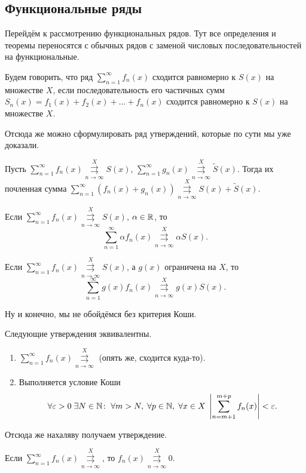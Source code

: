 \documentclass[a4paper, 12pt]{article}
\begin{document}
	\subsection{Функциональные ряды}
	Перейдём к рассмотрению функциональных рядов. Тут все определения и теоремы переносятся с обычных рядов с заменой числовых последовательностей на функциональные.
	\begin{Def}
		Будем говорить, что ряд $\sum\limits_{n=1}^{\infty}f_n(x)$ сходится равномерно к $S(x)$ на множестве $X$, если последовательность его частичных сумм $S_n(x) = f_1(x) + f_2(x) + \ldots + f_n(x)$ сходится равномерно к $S(x)$ на множестве $X$. 
	\end{Def}
	Отсюда же можно сформулировать ряд утверждений, которые по сути мы уже доказали.
	\begin{Statement}
		Пусть $\sum\limits_{n=1}^\infty f_n(x) \overset{X}{\underset{n\to\infty}{\rightrightarrows}} S(x)$, 
		$\sum\limits_{n=1}^\infty g_n(x) \overset{X}{\underset{n\to\infty}{\rightrightarrows}} \tilde{S}(x)$. Тогда их почленная сумма $\sum\limits_{n=1}^\infty  (f_n(x) + g_n(x) ) \overset{X}{\underset{n\to\infty}{\rightrightarrows}} S(x) + \tilde{S}(x)$.
	\end{Statement}
	\begin{Statement}
		Если $\sum\limits_{n=1}^\infty f_n(x) \overset{X}{\underset{n\to\infty}{\rightrightarrows}} S(x)$, $\alpha \in \mathbb{R}$, то
		$$
			\sum\limits_{n=1}^\infty \alpha f_n(x) \overset{X}{\underset{n\to\infty}{\rightrightarrows}} \alpha S(x).
		$$
	\end{Statement}
	\begin{Statement}
		Если $\sum\limits_{n=1}^\infty f_n(x) \overset{X}{\underset{n\to\infty}{\rightrightarrows}} S(x)$, а $g(x)$ ограничена на $X$, то 
		$$
		\sum\limits_{n=1}^\infty g(x) f_n(x) \overset{X}{\underset{n\to\infty}{\rightrightarrows}} g(x)S(x).
		$$
	\end{Statement}
	Ну и конечно, мы не обойдёмся без критерия Коши.
	\begin{Statement}
		Следующие утверждения эквивалентны.
		\begin{enumerate}
			\item $\sum\limits_{n=1}^\infty f_n(x) \overset{X}{\underset{n\to\infty}{\rightrightarrows}}$ (опять же, сходится куда-то).
			\item Выполняется условие Коши 
			$$\forall \varepsilon >0\; \exists N \in \mathbb{N}\colon \; \forall m>N,\; \forall p \in \mathbb{N},\; \forall x\in X\; \left|\sum_{n=m+1}^{m+p} f_n(x)\right| < \varepsilon.
			$$
		\end{enumerate}
	\end{Statement}
	Отсюда же нахаляву получаем утверждение.
	\begin{Statement}
		Если $\sum\limits_{n=1}^\infty f_n(x)  \overset{X}{\underset{n\to\infty}{\rightrightarrows}}$, то $f_n(x) \overset{X}{\underset{n\to\infty}{\rightrightarrows}} 0$.
	\end{Statement}
\end{document}
